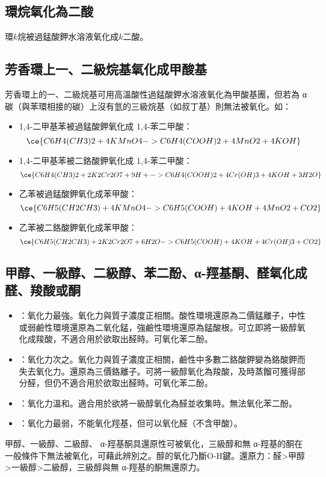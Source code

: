 \documentclass[a4paper,12pt]{report}
\begin{document}
\begin{itemize}
\subsection{環烷氧化為二酸}
環$k$烷被過錳酸鉀水溶液氧化成$k$二酸。
\subsection{芳香環上一、二級烷基氧化成甲酸基}
芳香環上的一、二級烷基可用高溫酸性過錳酸鉀水溶液氧化為甲酸基團，但若為 α 碳（與苯環相接的碳）上沒有氫的三級烷基（如叔丁基）則無法被氧化。如：
\begin{itemize}
\item 1,4-二甲基苯被過錳酸鉀氧化成 1,4-苯二甲酸：
\[\ce{C6H4(CH3)2 + 4KMnO4 -> C6H4(COOH)2 + 4MnO2 + 4KOH}\]
\item 1,4-二甲基苯被二鉻酸鉀氧化成 1,4-苯二甲酸：
\[\ce{C6H4(CH3)2 + 2K2Cr2O7 + 9H+ -> C6H4(COOH)2 + 4Cr(OH)3 + 4KOH + 3H2O}\]
\item 乙苯被過錳酸鉀氧化成苯甲酸：
\[\ce{C6H5(CH2CH3) + 4KMnO4 -> C6H5(COOH) + 4KOH + 4MnO2 + CO2}\]
\item 乙苯被二鉻酸鉀氧化成苯甲酸：
\[\ce{C6H5(CH2CH3) + 2K2Cr2O7 + 6H2O -> C6H5(COOH) + 4KOH + 4Cr(OH)3 + CO2}\]
\end{itemize}
\subsection{甲醇、一級醇、二級醇、苯二酚、α-羥基酮、醛氧化成醛、羧酸或酮}
\begin{itemize}
\item {}：氧化力最強。氧化力與質子濃度正相關。酸性環境還原為二價錳離子，中性或弱鹼性環境還原為二氧化錳，強鹼性環境還原為錳酸根。可立即將一級醇氧化成羧酸，不適合用於欲取出醛時。可氧化苯二酚。
\item {}：氧化力次之。氧化力與質子濃度正相關，鹼性中多數二鉻酸鉀變為鉻酸鉀而失去氧化力。還原為三價鉻離子。可將一級醇氧化為羧酸，及時蒸餾可獲得部分醛，但仍不適合用於欲取出醛時。可氧化苯二酚。
\item {}：氧化力溫和。適合用於欲將一級醇氧化為醛並收集時。無法氧化苯二酚。
\item {}：氧化力最弱，不能氧化羥基，但可以氧化醛（不含甲酸）。
\end{itemize}
甲醇、一級醇、二級醇、 α-羥基酮具還原性可被氧化，三級醇和無 α-羥基的酮在一般條件下無法被氧化，可藉此辨別之。醇的氧化乃斷O-H鍵。還原力：醛>甲醇>一級醇>二級醇，三級醇與無 α-羥基的酮無還原力。

\end{itemize}
\end{document}
